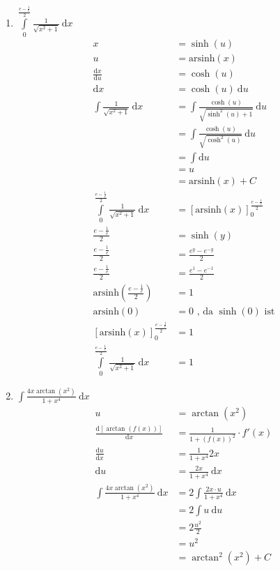 \documentclass[10pt]{article}
\begin{document}
\begin{enumerate}[start=5,leftmargin=1in]
\begin{enumerate}
        \item $\int\limits_{0}^{\frac{e-\frac{1}{e}}{2}} \frac{1}{\sqrt{x^{2}+1}} \: \text{d}x$
        \begin{align*}
            x &= \sinh(u) \\
            u &= \text{arsinh}(x) \\
            \frac{\text{d}x}{\text{d}u} &= \cosh(u) \\
            \text{d}x &= \cosh(u) \: \text{d}u \\
            \int \frac{1}{\sqrt{x^{2}+1}} \: \text{d}x &= \int \frac{\cosh(u)}{\sqrt{\sinh^{2}(u)+1}} \: \text{d}u \\
            &= \int \frac{\cosh(u)}{\sqrt{\cosh^{2}(u)}} \: \text{d}u \\
            &= \int \text{d}u \\
            &= u \\
            &= \text{arsinh}(x) + C \\
            \int\limits_{0}^{\frac{e-\frac{1}{e}}{2}} \frac{1}{\sqrt{x^{2}+1}} \: \text{d}x &= [\text{arsinh}(x)]_{0}^{\frac{e-\frac{1}{e}}{2}} \\
            \frac{e-\frac{1}{e}}{2} &= \sinh(y) \\
            \frac{e-\frac{1}{e}}{2} &= \frac{e^{y} - e^{-y}}{2} \\
            \frac{e-\frac{1}{e}}{2} &= \frac{e^{1} - e^{-1}}{2} \\
            \text{arsinh}\left(\frac{e-\frac{1}{e}}{2}\right) &= 1 \\
            \text{arsinh}(0) &= 0 \text{ , da } \sinh(0) \text{ ist} \\
            [\text{arsinh}(x)]_{0}^{\frac{e-\frac{1}{e}}{2}} &= 1 \\
            \int\limits_{0}^{\frac{e-\frac{1}{e}}{2}} \frac{1}{\sqrt{x^{2}+1}} \: \text{d}x &= 1
        \end{align*}

        \item $\int \frac{4x \arctan(x^2)}{1+x^4} \: \text{d}x$
        \begin{align*}
            u &= \arctan(x^2) \\
            \frac{\text{d}[\arctan(f(x))]}{\text{d}x} &= \frac{1}{1 + (f(x))^2} \cdot f'(x) \\
            \frac{\text{d}u}{\text{d}x} &= \frac{1}{1 + x^4} 2x \\
            \text{d}u &= \frac{2x}{1 + x^4} \: \text{d}x \\
            \int \frac{4x \arctan(x^2)}{1 + x^4} \: \text{d}x &= 2 \int \frac{2x \cdot u}{1 + x^4} \: \text{d}x \\
            &= 2 \int u \: \text{d}u \\
            &= 2 \frac{u^2}{2} \\
            &= u^2 \\
            &= \arctan^2(x^2) + C
        \end{align*}


\end{enumerate}
\end{enumerate}
\end{document}
